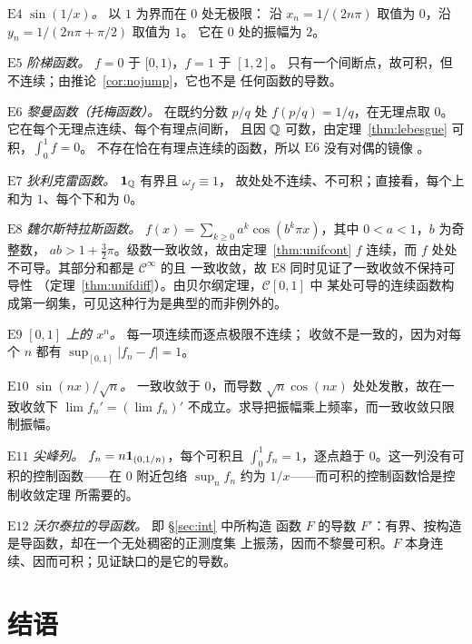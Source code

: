 \smallskip\noindent
$\mathrm{E}4$ \emph{$\sin(1/x)$。} 以 $1$ 为界而在 $0$ 处无极限：
沿 $x_n=1/(2n\pi)$ 取值为 $0$，沿 $y_n = 1/(2n\pi+\pi/2)$ 取值为 $1$。
它在 $0$ 处的振幅为 $2$。

\smallskip\noindent
$\mathrm{E}5$ \emph{阶梯函数。} $f=0$ 于 $[0,1)$，$f=1$ 于 $[1,2]$。
只有一个间断点，故可积，但不连续；由推论~\ref{cor:nojump}，它也不是
任何函数的导数。

\smallskip\noindent
$\mathrm{E}6$ \emph{黎曼函数（托梅函数）。} 在既约分数 $p/q$ 处
$f(p/q)=1/q$，在无理点取 $0$。它在每个无理点连续、每个有理点间断，
且因 $\mathbb{Q}$ 可数，由定理~\ref{thm:lebesgue} 可积，$\int_0^1 f = 0$。
不存在恰在有理点连续的函数，所以 $\mathrm{E}6$ 没有对偶的镜像
\cite[第 4 章附录]{annotated}。

\smallskip\noindent
$\mathrm{E}7$ \emph{狄利克雷函数。} $\mathbf{1}_{\mathbb{Q}}$ 有界且 $\omega_f\equiv1$，
故处处不连续、不可积；直接看，每个上和为 $1$、每个下和为 $0$。

\smallskip\noindent
$\mathrm{E}8$ \emph{魏尔斯特拉斯函数。}
$f(x)=\sum_{k\ge0} a^k\cos(b^k\pi x)$，其中 $0<a<1$，$b$ 为奇整数，
$ab>1+\tfrac32\pi$。级数一致收敛，故由定理~\ref{thm:unifcont}
$f$ 连续，而 $f$ 处处不可导。其部分和都是 $\mathscr{C}^\infty$ 的且
一致收敛，故 $\mathrm{E}8$ 同时见证了一致收敛不保持可导性
（定理~\ref{thm:unifdiff}）。由贝尔纲定理，$\mathscr{C}[0,1]$ 中
某处可导的连续函数构成第一纲集，可见这种行为是典型的而非例外的。

\smallskip\noindent
$\mathrm{E}9$ \emph{$[0,1]$ 上的 $x^n$。} 每一项连续而逐点极限不连续；
收敛不是一致的，因为对每个 $n$ 都有 $\sup_{[0,1]}|f_n-f| = 1$。

\smallskip\noindent
$\mathrm{E}10$ \emph{$\sin(nx)/\sqrt n$。} 一致收敛于 $0$，而导数
$\sqrt n\cos(nx)$ 处处发散，故在一致收敛下 $\lim f_n' = (\lim f_n)'$
不成立。求导把振幅乘上频率，而一致收敛只限制振幅。

\smallskip\noindent
$\mathrm{E}11$ \emph{尖峰列。} $f_n = n\mathbf{1}_{(0,1/n)}$，每个可积且
$\int_0^1 f_n = 1$，逐点趋于 $0$。这一列没有可积的控制函数——在 $0$
附近包络 $\sup_n f_n$ 约为 $1/x$——而可积的控制函数恰是控制收敛定理
所需要的。

\smallskip\noindent
$\mathrm{E}12$ \emph{沃尔泰拉的导函数。} 即 \S\ref{sec:int} 中所构造
函数 $F$ 的导数 $F'$：有界、按构造是导函数，却在一个无处稠密的正测度集
上振荡，因而不黎曼可积。$F$ 本身连续、因而可积；见证缺口的是它的导数。

\section{结语}

